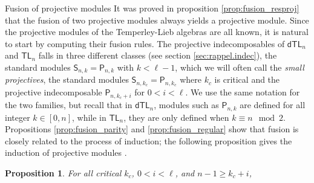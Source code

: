 \documentclass[reqno]{amsart}
\newtheorem{Prop}[Thm]{Proposition}
\newcommand{\dtl}[1]{\mathsf{dTL}_{#1}}
\newcommand{\tl}[1]{\mathsf{TL}_{#1}}
\newcommand{\ds}[1]{\mathsf S_{#1}}
\newcommand{\dl}[1]{\mathsf I_{#1}}
\newcommand{\dP}[1]{\mathsf P_{#1}}
\newcommand{\kc}{k_c}
\newcommand{\lc}{\ell}
\begin{document}
\begin{section}{Fusion of projective modules}\label{sec:fusionproj}
It was proved in proposition \ref{prop:fusion_resproj} that the fusion of two projective modules always yields a projective module. Since the projective modules of the Temperley-Lieb algebras are all known, it is natural to start by computing their fusion rules. The projective indecomposables of $\dtl{n}$ and $\tl{n}$ falls in three different classes (see section \ref{sec:rappel.indec}), the standard modules $\ds{n,k}=\dP{n,k}$ with $k<\lc-1$, which we will often call the \emph{small projectives}, the standard modules $\ds{n,\kc}=\dP{n,\kc}$ where $\kc$ is critical and the projective indecomposable $\dP{n,\kc+i}$ for $0<i<\lc$. We use the same notation for the two families, but recall that in $\dtl{n}$, modules such as $\dP{n,k}$ are defined for all integer $k \in [0,n]$, while in $\tl{n}$, they are only defined when $k \equiv n \mod 2$.
Propositions \ref{prop:fusion_parity} and \ref{prop:fusion_regular} show that fusion is closely related to the process of induction; the following proposition gives the induction of projective modules \cite{BelSY,BelRiSy}.
\begin{Prop}
For all critical $\kc$, $0<i<\lc$, and $n-1\geq \kc +i$,

\end{Prop}
\end{section}
\end{document}

